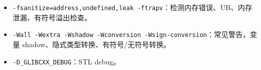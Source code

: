 \begin{itemize}
\item \texttt{-fsanitize=address,undefined,leak -ftrapv}：检测内存错误、UB、内存泄漏、有符号溢出检查。
\item \texttt{-Wall -Wextra -Wshadow -Wconversion -Wsign-conversion}：常见警告，变量 shadow、隐式类型转换、有符号/无符号转换。
\item \texttt{-D\_GLIBCXX\_DEBUG}：STL debug。
\end{itemize}
